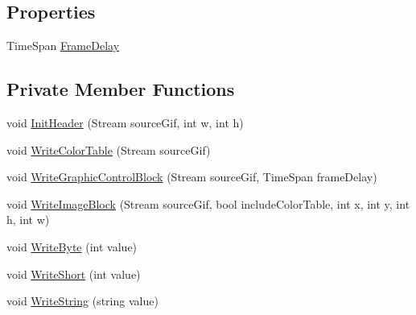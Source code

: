 \subsection*{Properties}
\begin{DoxyCompactItemize}
\item 
Time\+Span \mbox{\hyperlink{class_paint___program_1_1_gif_encoder_af0a0f68f22ddcf8d84f2456adbc46165}{Frame\+Delay}}
\end{DoxyCompactItemize}
\subsection*{Private Member Functions}
\begin{DoxyCompactItemize}
\item 
void \mbox{\hyperlink{class_paint___program_1_1_gif_encoder_abd4a3c3ab853d69be3551d16336cfe30}{Init\+Header}} (Stream source\+Gif, int w, int h)
\item 
void \mbox{\hyperlink{class_paint___program_1_1_gif_encoder_aab69513dafb7327f9decb3530313733e}{Write\+Color\+Table}} (Stream source\+Gif)
\item 
void \mbox{\hyperlink{class_paint___program_1_1_gif_encoder_aa549684b738eea97d7a00dd5df7bfe2e}{Write\+Graphic\+Control\+Block}} (Stream source\+Gif, Time\+Span frame\+Delay)
\item 
void \mbox{\hyperlink{class_paint___program_1_1_gif_encoder_a9668d36c48e46fd19a1679d442c2e228}{Write\+Image\+Block}} (Stream source\+Gif, bool include\+Color\+Table, int x, int y, int h, int w)
\item 
void \mbox{\hyperlink{class_paint___program_1_1_gif_encoder_a84c115c0609f30a5e20d4848400c8695}{Write\+Byte}} (int value)
\item 
void \mbox{\hyperlink{class_paint___program_1_1_gif_encoder_a64eb9e9108dbea9bf73e3ec0ca4e78fb}{Write\+Short}} (int value)
\item 
void \mbox{\hyperlink{class_paint___program_1_1_gif_encoder_a06fd85f8278561716c8dc37041d24497}{Write\+String}} (string value)
\end{DoxyCompactItemize}
